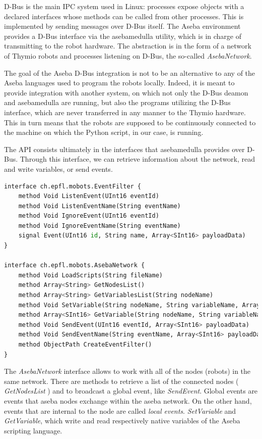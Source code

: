 \documentclass[format=acmsmall, review=false, screen=true]{acmart}
\begin{document}
D-Bus is the main IPC system used in Linux: processes expose objects with a declared interfaces whose methods can be called from other processes. This is implemented by sending messages over D-Bus itself. The Aseba environment provides a D-Bus interface via the asebamedulla utility, which is in charge of transmitting to the robot hardware. The abstraction is in the form of a network of Thymio robots and processes listening on D-Bus, the so-called \emph{AsebaNetwork}. 

The goal of the Aseba D-Bus integration is not to be an alternative to any of the Aseba languages used to program the robots locally. Indeed, it is meant to provide integration with another system, on which not only the D-Bus deamon and asebamedulla are running, but also the programs utilizing the D-Bus interface, which are never transferred in any manner to the Thymio hardware. This in turn means that the robots are supposed to be continuously connected to the machine on which the Python script, in our case, is running.

The API consists ultimately in the interfaces that asebamedulla provides over D-Bus. Through this interface, we can retrieve information about the network, read and write variables, or send events.

\begin{lstlisting}[caption={\ The API that asebamedulla provides over D-Bus},language=Python,captionpos=b,label={Asebamedulla API},basicstyle=\small]
interface ch.epfl.mobots.EventFilter {
    method Void ListenEvent(UInt16 eventId)
    method Void ListenEventName(String eventName)
    method Void IgnoreEvent(UInt16 eventId)
    method Void IgnoreEventName(String eventName)
    signal Event(UInt16 id, String name, Array<SInt16> payloadData)
}

interface ch.epfl.mobots.AsebaNetwork {
    method Void LoadScripts(String fileName)
    method Array<String> GetNodesList()
    method Array<String> GetVariablesList(String nodeName)
    method Void SetVariable(String nodeName, String variableName, Array<SInt16> variableData)
    method Array<SInt16> GetVariable(String nodeName, String variableName)
    method Void SendEvent(UInt16 eventId, Array<SInt16> payloadData)
    method Void SendEventName(String eventName, Array<SInt16> payloadData)
    method ObjectPath CreateEventFilter()
}
\end{lstlisting}


The \emph{AsebaNetwork} interface allows to work with all of the nodes (robots) in the same network. There are methods to retrieve a list of the connected nodes ( \emph{GetNodesList} ) and to broadcast a global event, like \emph{SendEvent}. Global events are events that aseba nodes exchange within the aseba network. On the other hand, events that are internal to the node are called \emph{local events}. \emph{SetVariable} and \emph{GetVariable}, which write and read respectively native variables of the Aseba scripting language.
\end{document}
